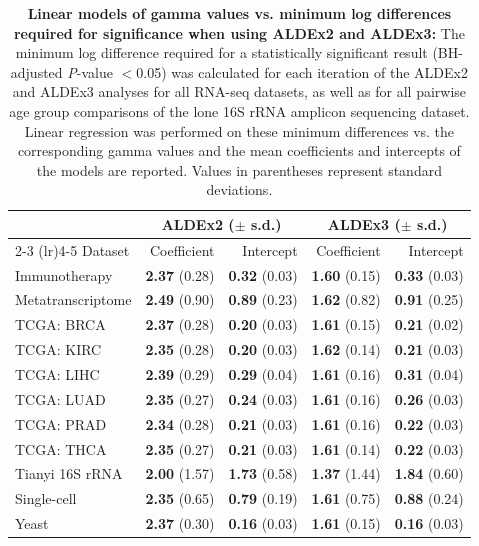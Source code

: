 \documentclass[10pt,letterpaper]{article}
\begin{document}
\begin{table}[H]
    \caption{\textbf{Linear models of gamma values vs. minimum log differences required for significance when using ALDEx2 and ALDEx3:} The minimum log difference required for a statistically significant result (BH-adjusted \textit{P}-value $<$0.05) was calculated for each iteration of the ALDEx2 and ALDEx3 analyses for all RNA-seq datasets, as well as for all pairwise age group comparisons of the lone 16S rRNA amplicon sequencing dataset. Linear regression was performed on these minimum differences vs. the corresponding gamma values and the mean coefficients and intercepts of the models are reported. Values in parentheses represent standard deviations.}
    \centering
    \begin{tabular}{lrrrr}
         \toprule
         & \multicolumn{2}{c}{ALDEx2 ($\pm$ s.d.)} & \multicolumn{2}{c}{ALDEx3 ($\pm$ s.d.)}\\
         \cmidrule(lr){2-3} \cmidrule(lr){4-5}
         Dataset & Coefficient & Intercept & Coefficient & Intercept\\
         \midrule
         Immunotherapy & \textbf{2.37} (0.28) & \textbf{0.32} (0.03) & \textbf{1.60} (0.15) & \textbf{0.33} (0.03) \\
         Metatranscriptome & \textbf{2.49} (0.90) & \textbf{0.89} (0.23) & \textbf{1.62} (0.82) & \textbf{0.91} (0.25) \\
         TCGA: BRCA & \textbf{2.37} (0.28) & \textbf{0.20} (0.03) & \textbf{1.61} (0.15) & \textbf{0.21} (0.02) \\
         TCGA: KIRC & \textbf{2.35} (0.28) & \textbf{0.20} (0.03) & \textbf{1.62} (0.14) & \textbf{0.21} (0.03) \\
         TCGA: LIHC & \textbf{2.39} (0.29) & \textbf{0.29} (0.04) & \textbf{1.61} (0.16) & \textbf{0.31} (0.04) \\
         TCGA: LUAD & \textbf{2.35} (0.27) & \textbf{0.24} (0.03) & \textbf{1.61} (0.16) & \textbf{0.26} (0.03) \\
         TCGA: PRAD & \textbf{2.34} (0.28) & \textbf{0.21} (0.03) & \textbf{1.61} (0.16) & \textbf{0.22} (0.03) \\
         TCGA: THCA & \textbf{2.35} (0.27) & \textbf{0.21} (0.03) & \textbf{1.61} (0.14) & \textbf{0.22} (0.03) \\
         Tianyi 16S rRNA & \textbf{2.00} (1.57) & \textbf{1.73} (0.58) & \textbf{1.37} (1.44) & \textbf{1.84} (0.60) \\
         Single-cell & \textbf{2.35} (0.65) & \textbf{0.79} (0.19) & \textbf{1.61} (0.75) & \textbf{0.88} (0.24) \\
         Yeast & \textbf{2.37} (0.30) & \textbf{0.16} (0.03) & \textbf{1.61} (0.15) & \textbf{0.16} (0.03) \\
         \bottomrule
    \end{tabular}
    \label{tab:regression}
\end{table}
\end{document}

